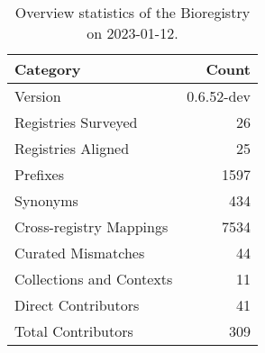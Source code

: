 \begin{table}
\centering
\caption{Overview statistics of the Bioregistry on 2023-01-12.}
\label{tab:bioregistry-summary}
\begin{tabular}{lr}
\toprule
                Category &      Count \\
\midrule
                 Version & 0.6.52-dev \\
     Registries Surveyed &         26 \\
      Registries Aligned &         25 \\
                Prefixes &       1597 \\
                Synonyms &        434 \\
 Cross-registry Mappings &       7534 \\
      Curated Mismatches &         44 \\
Collections and Contexts &         11 \\
     Direct Contributors &         41 \\
      Total Contributors &        309 \\
\bottomrule
\end{tabular}
\end{table}
